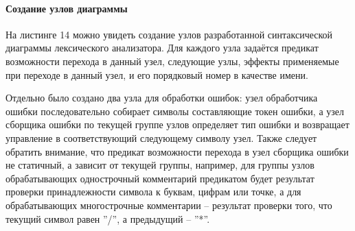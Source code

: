 \documentclass[a4paper,final]{article}
\begin{document}
\paragraph{Создание узлов диаграммы\\[1em]}
На листинге 14 можно увидеть создание узлов разработанной синтаксической диаграммы лексического анализатора. Для каждого узла задаётся предикат возможности перехода в данный узел, следующие узлы, эффекты применяемые при переходе в данный узел, и его порядковый номер в качестве имени. 

Отдельно было создано два узла для обработки ошибок: узел обработчика ошибки последовательно собирает символы составляющие токен ошибки, а узел сборщика ошибки по текущей группе узлов определяет тип ошибки и возвращает управление в соответствующий следующему символу узел. Также следует обратить внимание, что предикат возможности перехода в узел сборщика ошибки не статичный, а зависит от текущей группы, например, для группы узлов обрабатывающих однострочный комментарий предикатом будет результат проверки принадлежности символа к буквам, цифрам или точке, а для обрабатывающих многострочные комментарии -- результат проверки того, что текущий символ равен ''/'', а предыдущий -- ''*''.
\end{document}
